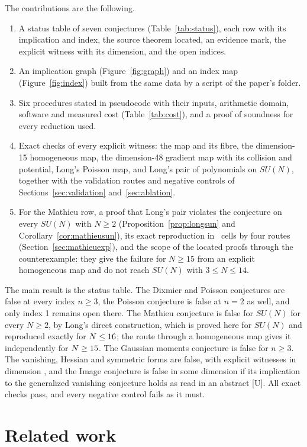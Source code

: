 \documentclass[11pt]{article}
\theoremstyle{remark}
\begin{document}
The contributions are the following.
\begin{enumerate}
\item A status table of seven conjectures (Table~\ref{tab:status}), each row with its implication and index, the source theorem located, an evidence mark, the explicit witness with its dimension, and the open indices.
\item An implication graph (Figure~\ref{fig:graph}) and an index map (Figure~\ref{fig:index}) built from the same data by a script of the paper's folder.
\item Six procedures stated in pseudocode with their inputs, arithmetic domain, software and measured cost (Table~\ref{tab:cost}), and a proof of soundness for every reduction used.
\item Exact checks of every explicit witness: the map and its fibre, the dimension-15 homogeneous map, the dimension-48 gradient map with its collision and potential, Long's Poisson map, and Long's pair of polynomials on $SU(N)$, together with the validation routes and negative controls of Sections~\ref{sec:validation} and~\ref{sec:ablation}.
\item For the Mathieu row, a proof that Long's pair violates the conjecture on every $SU(N)$ with $N\ge2$ (Proposition~\ref{prop:longsun} and Corollary~\ref{cor:mathieusun}), its exact reproduction in \nmccells\ cells by four routes (Section~\ref{sec:mathieuexp}), and the scope of the located proofs through the counterexample: they give the failure for $N\ge15$ from an explicit homogeneous map and do not reach $SU(N)$ with $3\le N\le14$.
\end{enumerate}

The main result is the status table. The Dixmier and Poisson conjectures are false at every index $n\ge3$, the Poisson conjecture is false at $n=2$ as well, and only index 1 remains open there. The Mathieu conjecture is false for $SU(N)$ for every $N\ge2$, by Long's direct construction, which is proved here for $SU(N)$ and reproduced exactly for $N\le16$; the route through a homogeneous map gives it independently for $N\ge15$. The Gaussian moments conjecture is false for $n\ge3$. The vanishing, Hessian and symmetric forms are false, with explicit witnesses in dimension \nwitnessdim, and the Image conjecture is false in some dimension if its implication to the generalized vanishing conjecture holds as read in an abstract [U]. All exact checks pass, and every negative control fails as it must.

\section{Related work}\label{sec:related}
\end{document}
